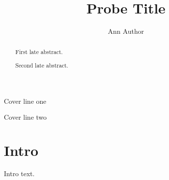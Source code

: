 \documentclass{article}
\title{Probe Title}\author{Ann Author}
\begin{document}
\maketitle
\begin{center}Cover line one\end{center}
\begin{abstract}First late abstract.\end{abstract}
\begin{center}Cover line two\end{center}
\begin{abstract}Second late abstract.\end{abstract}
\section{Intro}
Intro text.
\end{document}
